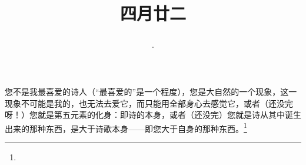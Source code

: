 \title{\date[d=29,m=5,y=2024][year:cn-y,年,month:cn,day:cn,日,·,weekday]·四月廿二 }
您不是我最喜爱的诗人（“最喜爱的”是一个程度），您是大自然的一个现象，这一现象不可能是我的，也无法去爱它，而只能用全部身心去感觉它，或者（还没完呀！）您就是第五元素的化身：即诗的本身，或者（还没完）您就是诗从其中诞生出来的那种东西，是大于诗歌本身——即您大于自身的那种东西。\footnote{ }

